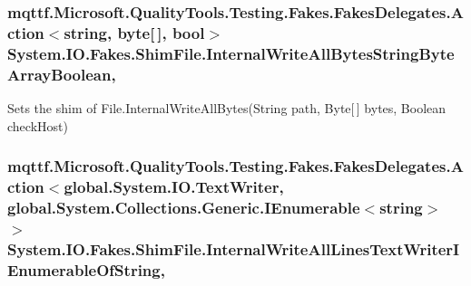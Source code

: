 \hypertarget{class_system_1_1_i_o_1_1_fakes_1_1_shim_file_a850a9635ade7222bb31e49ec8da8ca98}{
\subsubsection[{Internal\-Write\-All\-Bytes\-String\-Byte\-Array\-Boolean}]{\setlength{\rightskip}{0pt plus 5cm}mqttf.\-Microsoft.\-Quality\-Tools.\-Testing.\-Fakes.\-Fakes\-Delegates.\-Action$<$string, byte\mbox{[}$\,$\mbox{]}, bool$>$ System.\-I\-O.\-Fakes.\-Shim\-File.\-Internal\-Write\-All\-Bytes\-String\-Byte\-Array\-Boolean\hspace{0.3cm}{\ttfamily [static]}, {\ttfamily [set]}}}\label{class_system_1_1_i_o_1_1_fakes_1_1_shim_file_a850a9635ade7222bb31e49ec8da8ca98}


Sets the shim of File.\-Internal\-Write\-All\-Bytes(\-String path, Byte\mbox{[}$\,$\mbox{]} bytes, Boolean check\-Host)

\hypertarget{class_system_1_1_i_o_1_1_fakes_1_1_shim_file_a5bd7106bd8a8160b188c07c706a063a2}{
\subsubsection[{Internal\-Write\-All\-Lines\-Text\-Writer\-I\-Enumerable\-Of\-String}]{\setlength{\rightskip}{0pt plus 5cm}mqttf.\-Microsoft.\-Quality\-Tools.\-Testing.\-Fakes.\-Fakes\-Delegates.\-Action$<$global.\-System.\-I\-O.\-Text\-Writer, global.\-System.\-Collections.\-Generic.\-I\-Enumerable$<$string$>$ $>$ System.\-I\-O.\-Fakes.\-Shim\-File.\-Internal\-Write\-All\-Lines\-Text\-Writer\-I\-Enumerable\-Of\-String\hspace{0.3cm}{\ttfamily [static]}, {\ttfamily [set]}}}\label{class_system_1_1_i_o_1_1_fakes_1_1_shim_file_a5bd7106bd8a8160b188c07c706a063a2}


